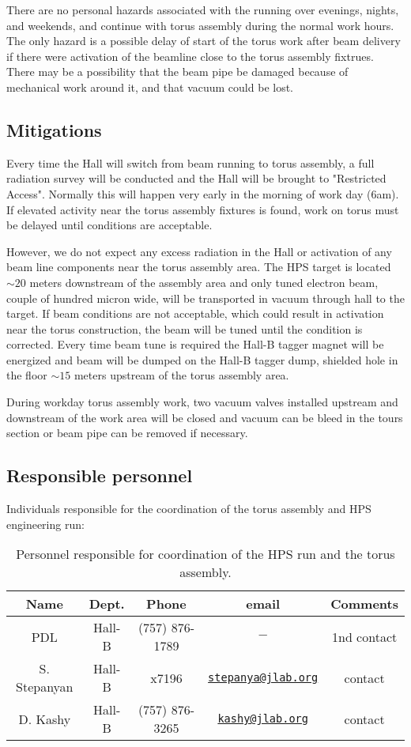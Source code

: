 \documentclass[11pt]{report}
\begin{document}
There are no personal hazards associated with the running over evenings, nights, and weekends, and continue with torus assembly during the normal work hours. The only hazard is a possible delay of start of the torus work after beam delivery if there were activation of the beamline close to the torus assembly fixtrues. There may be a possibility that the beam pipe be damaged because of mechanical work around it, and that vacuum could be lost.  
 
\subsection{Mitigations}
\indent

Every time the Hall will switch from beam running to torus assembly, a full radiation survey will be conducted and the Hall will be brought to "Restricted Access". Normally this will happen very early in the morning of work day (6am). If elevated activity near the torus assembly fixtures is found, work on torus must be delayed until conditions are acceptable. 

However, we do not expect any excess radiation in the Hall or activation of any beam line components near the torus assembly area. The HPS  target is located $\sim20$ meters downstream of the assembly area and only tuned electron beam, couple of hundred micron wide, will be transported in vacuum through hall to the target. If beam conditions are not acceptable, which could result in activation near the torus construction, the beam will be tuned until the condition is corrected. Every time beam tune is required the Hall-B tagger magnet will be energized and beam will be dumped on the Hall-B tagger dump, shielded hole in the floor $\sim 15$ meters upstream of the torus assembly area. 

During workday torus assembly work, two vacuum valves installed upstream and downstream of the work area will be closed and vacuum can be bleed in the tours section or beam pipe can be removed if necessary.
 
\subsection{Responsible personnel}
\indent

Individuals responsible for the coordination of the torus assembly and HPS engineering run:

\begin{table}[!htb]
 \centering
 \begin{tabular}{|c|c|c|c|c|}
\hline
 Name&Dept.&Phone&email&Comments \\ \hline
PDL & Hall-B&(757) 876-1789&$-$&1nd contact \\ \hline
S. Stepanyan & Hall-B&x7196&\href{mailto:stepanya@jlab.org}{\nolinkurl{stepanya@jlab.org}}&contact \\ \hline
D. Kashy & Hall-B&(757) 876-3265&\href{mailto:kashy@jlab.org}{\nolinkurl{kashy@jlab.org}}&contact \\ \hline
 \end{tabular}
\caption{Personnel responsible for coordination of the HPS run and the torus assembly.} 
\label{tb:clas12}
\end{table}
\end{document}
